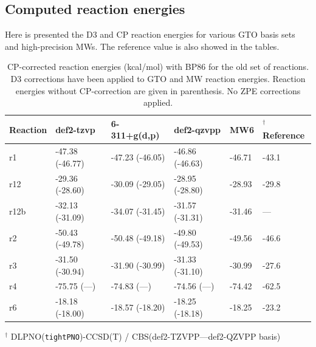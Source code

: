 \documentclass[11pt,a4paper]{article}
\begin{document}
	\subsection{Computed reaction energies}
	Here is presented the D3 and CP reaction energies for various GTO basis sets and high-precision MWs. The reference value\parencite{dohm2018} is also showed in the tables.
	
	\begin{table}[H]
		\centering
		\label{tab: rxn energies old bp86}
		\caption{CP-corrected reaction energies (\si{kcal/mol}) with BP86 for the old set of reactions. D3 corrections have been applied to GTO and MW reaction energies. Reaction energies without CP-correction are given in parenthesis. No ZPE corrections applied.}
		\begin{threeparttable}
		\begin{tabular}{l l l l l l }
			\toprule
			Reaction & def2-tzvp       & 6-311+g(d,p)    & def2-qzvpp      & MW6    & $^\dagger$Reference \parencite{dohm2018} \\ \midrule
			r1       & -47.38 (-46.77) & -47.23 (-46.05) & -46.86 (-46.63) & -46.71 & -43.1                          \\
			r12      & -29.36 (-28.60) & -30.09 (-29.05) & -28.95 (-28.80) & -28.93 & -29.8                          \\
			r12b     & -32.13 (-31.09) & -34.07 (-31.45) & -31.57 (-31.31) & -31.46 & ---                               \\
			r2       & -50.43 (-49.78) & -50.48 (-49.18) & -49.80 (-49.53) & -49.56 & -46.6                          \\
			r3       & -31.50 (-30.94) & -31.90 (-30.99) & -31.33 (-31.10) & -30.99 & -27.6                          \\
			r4       & -75.75 (---)    & -74.83 (---)    & -74.56 (---)    & -74.42 & -62.5                      					    \\
			r6       & -18.18 (-18.00) & -18.57 (-18.20) & -18.25 (-18.18) & -18.25 & -23.2                          \\ \bottomrule
		\end{tabular}
\begin{tablenotes}
	\item $^\dagger$ DLPNO(\verb|tightPNO|)-CCSD(T) / CBS(def2-TZVPP---def2-QZVPP basis)
\end{tablenotes}

\end{threeparttable}
	\end{table}
\end{document}
